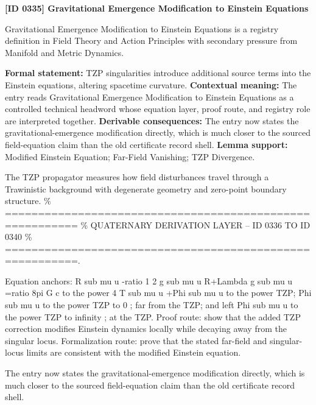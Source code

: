 \clearpage
\noindent\textbf{[ID 0335] Gravitational Emergence Modification to Einstein Equations}\par
\vspace{0.35em}
\begingroup\small
{}
Gravitational Emergence Modification to Einstein Equations is a registry definition in Field Theory and Action Principles with secondary pressure from Manifold and Metric Dynamics.

\begingroup\footnotesize\setlength{\emergencystretch}{3em}\sloppy
\textbf{Formal statement:} TZP singularities introduce additional source terms into the Einstein equations, altering spacetime curvature. \textbf{Contextual meaning:} The entry reads Gravitational Emergence Modification to Einstein Equations as a controlled technical headword whose equation layer, proof route, and registry role are interpreted together. \textbf{Derivable consequences:} The entry now states the gravitational-emergence modification directly, which is much closer to the sourced field-equation claim than the old certificate record shell. \textbf{Lemma support:} Modified Einstein Equation; Far-Field Vanishing; TZP Divergence.\par
\endgroup

The TZP propagator measures how field disturbances travel through a Trawinistic background with degenerate geometry and zero-point boundary structure. \% ========================================================= \% QUATERNARY DERIVATION LAYER -- ID 0336 TO ID 0340 \% =========================================================.

Equation anchors: R sub mu u -ratio 1 2 g sub mu u R+Lambda g sub mu u =ratio 8pi G c to the power 4 T sub mu u +Phi sub mu u to the power TZP; Phi sub mu u to the power TZP to 0 ; far from the TZP; and left Phi sub mu u to the power TZP to infinity ; at the TZP. Proof route: show that the added TZP correction modifies Einstein dynamics locally while decaying away from the singular locus. Formalization route: prove that the stated far-field and singular-locus limits are consistent with the modified Einstein equation.

The entry now states the gravitational-emergence modification directly, which is much closer to the sourced field-equation claim than the old certificate record shell.
\endgroup

